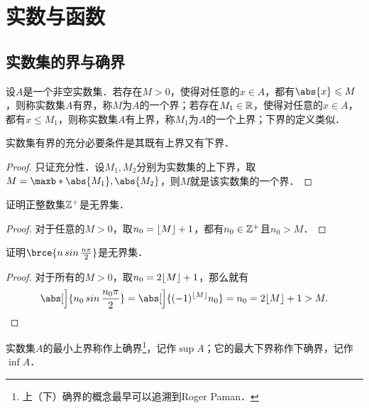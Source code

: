 \chapter{实数与函数}

\section{实数集的界与确界}

\begin{definition}
  \label{defn:bnd}
  设\(A\)是一个非空实数集．若存在\(M > 0\)，使得对任意的\(x \in A\)，都有\(\abs{x} \le M\)，则称实数集\(A\)有界，称\(M\)为\(A\)的一个界；若存在\(M_1 \in \mathbb{R}\)，使得对任意的\(x \in A\)，都有\(x \le M_1\)，则称实数集\(A\)有上界，称\(M_1\)为\(A\)的一个上界；下界的定义类似．
\end{definition}

\begin{theorem*}
  实数集有界的充分必要条件是其既有上界又有下界．

  \begin{proof}
    只证充分性．设\(M_1, M_2\)分别为实数集的上下界，取\(M = \maxb*{\abs{M_1}, \abs{M_2}}\)，则\(M\)就是该实数集的一个界．
  \end{proof}
\end{theorem*}

\begin{example*}
  证明正整数集\(\mathbb{Z}^+\)是无界集．

  \begin{proof}
    对于任意的\(M > 0\)，取\(n_0 = \lfloor M\rfloor + 1\)，都有\(n_0 \in \mathbb{Z}^+\)且\(n_0 > M\)．
  \end{proof}
\end{example*}


\begin{example*}
  证明\(\brce{n \sin \frac{n\pi}2}\)是无界集．

  \begin{proof}
    对于所有的\(M > 0\)，取\(n_0 = 2 \lfloor M\rfloor + 1\)，那么就有
    \[
      \abs[\Big]{n_0 \sin \frac{n_0\pi}2} = \abs[\Big]{(-1)^{\floor M} n_0} = n_0 = 2 \floor M + 1 > M. \qedhere
    \]
  \end{proof}
\end{example*}

\begin{definition*}
  实数集\(A\)的最小上界称作上确界\footnote{上（下）确界的概念最早可以追溯到Roger Paman．}，记作\(\sup A\)；它的最大下界称作下确界，记作\(\inf A\)．
\end{definition*}

